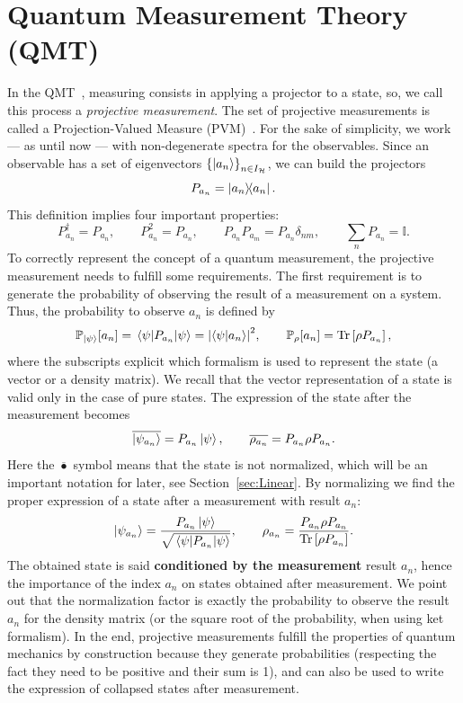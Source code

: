\section[Quantum measurement theory]{Quantum Measurement Theory (QMT)}\label{sec:qmt}\setlength{\parindent}{6mm}
In the QMT~\cite{W94,W96}, measuring consists in applying a projector to a state, so, we call this process a \textit{projective measurement}. The set of projective measurements is called a Projection-Valued Measure (PVM)~\cite{Holevo}. For the sake of simplicity, we work --- as until now --- with non-degenerate spectra for the observables. Since an observable has a set of eigenvectors $\qty{\ket{a_n}}_{n\in I_\mathcal{H}}$, we can build the projectors
\begin{equation}
    P_{a_n} = \ketbra{a_n}.
\end{equation}
This definition implies four important properties: 
\begin{equation*}
    P_{a_n}^\dagger = P_{a_n}, \qquad
    P_{a_n}^2 = P_{a_n}, \qquad
    P_{a_n} P_{a_m} = P_{a_n} \delta_{nm}, \qquad
    \sum_n P_{a_n}=\mathbb{I}.
\end{equation*}
To correctly represent the concept of a quantum measurement, the projective measurement needs to fulfill some requirements. The first requirement is to generate the probability of observing the result of a measurement on a system. Thus, the probability to observe $a_n$ is defined by
\begin{equation}
    \mathbb{P}_{\ket{\psi}}[a_n] = \expval{P_{a_n}}{\psi} = \abs{\braket{\psi}{a_n}}^2,\qquad
    \mathbb{P}_{\rho}[{a_n}] = \operatorname{Tr}\left[\rho P_{a_n}\right],
\end{equation}
where the subscripts explicit which formalism is used to represent the state (a vector or a density matrix). We recall that the vector representation of a state is valid only in the case of pure states. The expression of the state after the measurement becomes
\begin{equation}
    \overline{\ket{\psi_{a_n}}} = P_{a_n}\ket{\psi},\qquad
    \overline{\rho_{a_n}} = P_{a_n}\rho P_{a_n}.
\end{equation}
Here the $\overline{\bullet}$ symbol means that the state is not normalized, which will be an important notation for later, see Section~\ref{sec:Linear}. By normalizing we find the proper expression of a state after a measurement with result $a_n$:
\begin{equation}
    \ket{\psi_{a_n}}=\frac{P_{a_n}\ket{\psi}}{\sqrt{\expval{P_{a_n}}{\psi}}},\qquad
    \rho_{a_n} = \frac{P_{a_n}\rho P_{a_n}}{\operatorname{Tr}\left[\rho P_{a_n}\right]}.
\end{equation}
The obtained state is said \textbf{conditioned by the measurement} result $a_n$, hence the importance of the index $a_n$ on states obtained after measurement. We point out that the normalization factor is exactly the probability to observe the result $a_n$ for the density matrix (or the square root of the probability, when using ket formalism). In the end, projective measurements fulfill the properties of quantum mechanics by construction because they generate probabilities (respecting the fact they need to be positive and their sum is 1), and can also be used to write the expression of collapsed states after measurement.

